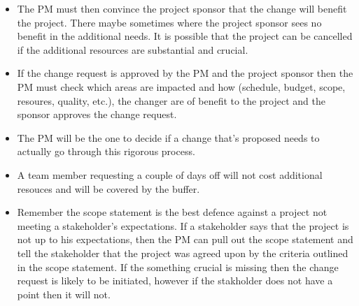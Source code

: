 \begin{itemize}
    \item The PM must then convince the project sponsor that the change will benefit the project. There maybe sometimes where the project sponsor sees no benefit in the additional needs. It is possible that the project can be cancelled if the additional resources are substantial and crucial.
    \item If the change request is approved by the PM and the project sponsor then the PM must check which areas are impacted and how (schedule, budget, scope, resoures, quality, etc.), the changer are of benefit to the project and the sponsor approves the change request.
    \item The PM will be the one to decide if a change that's proposed needs to actually go through this rigorous process.
    \item A team member requesting a couple of days off will not cost additional resouces and will be covered by the buffer.
    \item Remember the scope statement is the best defence against a project not meeting a stakeholder's expectations. If a stakeholder says that the project is not up to his expectations, then the PM can pull out the scope statement and tell the stakeholder that the project was agreed upon by the criteria outlined in the scope statement. If the something crucial is missing then the change request is likely to be initiated, however if the stakholder does not have a point then it will not.
\end{itemize}

